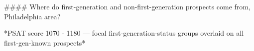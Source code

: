 #### Where do first-generation and non-first-generation prospects come from, Philadelphia area?

*PSAT score 1070 - 1180 — focal first-generation-status groups overlaid on all first-gen-known prospects*
